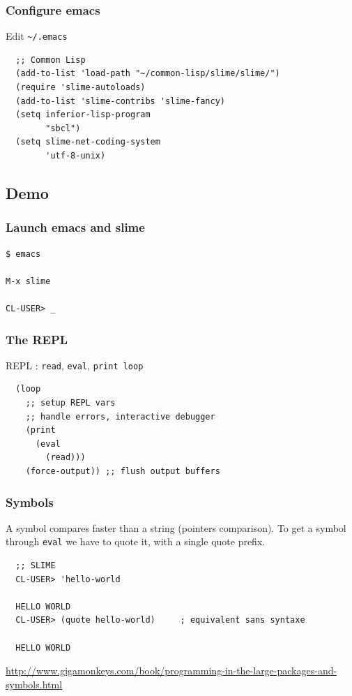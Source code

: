 \documentclass[8pt]{beamer}
\begin{document}
\begin{frame}[fragile]
  \frametitle{Configure emacs}
  Edit \tt{\textasciitilde/.emacs}
\begin{verbatim}
  ;; Common Lisp
  (add-to-list 'load-path "~/common-lisp/slime/slime/")
  (require 'slime-autoloads)
  (add-to-list 'slime-contribs 'slime-fancy)
  (setq inferior-lisp-program
        "sbcl")
  (setq slime-net-coding-system
        'utf-8-unix)
\end{verbatim}
\end{frame}

\subsection{Demo}

\begin{frame}[fragile]
  \frametitle{Launch emacs and slime}
\begin{verbatim}
$ emacs

M-x slime

CL-USER> _
\end{verbatim}
\end{frame}

\begin{frame}[fragile]
  \frametitle{The REPL}
  REPL : {\tt read}, {\tt eval}, {\tt print loop}
\begin{verbatim}
  (loop
    ;; setup REPL vars
    ;; handle errors, interactive debugger
    (print
      (eval
        (read)))
    (force-output)) ;; flush output buffers
\end{verbatim}
\end{frame}

\begin{frame}[fragile]
  \frametitle{Symbols}
  A symbol compares faster than a string
  (pointers comparison).
  To get a symbol through {\tt eval} we have to quote it, with a single quote prefix.
\begin{verbatim}
  ;; SLIME
  CL-USER> 'hello-world
  
  HELLO WORLD
  CL-USER> (quote hello-world)     ; equivalent sans syntaxe
  
  HELLO WORLD
\end{verbatim}
  \vspace{1em}
  \url{http://www.gigamonkeys.com/book/programming-in-the-large-packages-and-symbols.html}
\end{frame}
\end{document}
